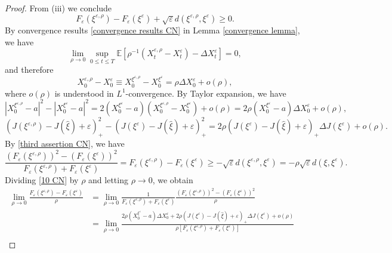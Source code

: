 \documentclass[11pt,a4paper]{article}
\begin{document}
\begin{proof}
From (iii) we conclude
\begin{equation}
\label{third assertion CN}
F_\varepsilon(\xi^{\varepsilon, \rho})-F_\varepsilon(\xi^\varepsilon)+\sqrt{\varepsilon}d(\xi^{\varepsilon, \rho},\xi^\varepsilon) \geq 0.
\end{equation}
By  convergence results \eqref{convergence results CN} in Lemma \ref{convergence lemma},  we have
$$\lim_{\rho \to 0}\sup_{0 \leq t \leq T}\mathbb E\left[\rho^{-1}(X^{\varepsilon, \rho}_t-{X}^\varepsilon_t)-\Delta{X}^\varepsilon_t\right]=0,$$
and therefore
$$X^{\varepsilon, \rho}_0-{X}^\varepsilon_0\equiv X_0^{\xi^{\varepsilon, \rho}}-X_0^{\xi^\varepsilon}=\rho\Delta{X}^\varepsilon_0+o(\rho),$$
where $o(\rho)$ is understood in $L^1$-convergence.
By Taylor expansion, we have
\begin{equation}
\label{Taylor1}
    |X_0^{\xi^{\varepsilon, \rho}}-a|^2-|X_0^{\xi^\varepsilon}-a|^2=2( X_0^{\xi^\varepsilon}-a)(X_0^{\xi^{\varepsilon, \rho}}-X_0^{\xi^\varepsilon})+o(\rho)=2 \rho( X_0^{\xi^\varepsilon}-a) \Delta{X}^\varepsilon_0+o(\rho),
\end{equation}
\begin{equation}
\label{Taylor2}
   (J(\xi^{\varepsilon, \rho})-J(\hat \xi)+\varepsilon)_+^2-(J(\xi^\varepsilon)-J(\hat \xi)+\varepsilon)_+^2=2\rho (J(\xi^\varepsilon)-J(\hat \xi)+\varepsilon)_+\Delta{J}(\xi^\varepsilon)+o(\rho). 
\end{equation}
By \eqref{third assertion CN}, we have 
\begin{equation}
\label{10 CN}
    \frac{(F_\varepsilon(\xi^{\varepsilon, \rho}))^2-(F_\varepsilon(\xi^\varepsilon))^2}{F_\varepsilon(\xi^{\varepsilon, \rho})+F_\varepsilon(\xi^\varepsilon)}=F_\varepsilon(\xi^{\varepsilon, \rho})-F_\varepsilon(\xi^\varepsilon)\geq -\sqrt{\varepsilon}d(\xi^{\varepsilon, \rho},\xi^\varepsilon)=-\rho\sqrt{\varepsilon}d(\xi,\xi^\varepsilon).
\end{equation}
Dividing \eqref{10 CN} by $\rho$ and letting $\rho \to 0$, we obtain
\begin{align*}
    \lim_{\rho \to 0}\frac{F_\varepsilon(\xi^{\varepsilon, \rho})-F_\varepsilon(\xi^\varepsilon)}{\rho}
    &=\lim_{\rho \to 0}\frac{1}{F_\varepsilon(\xi^{\varepsilon, \rho})+F_\varepsilon(\xi^\varepsilon)}\frac{(F_\varepsilon(\xi^{\varepsilon, \rho}))^2-(F_\varepsilon(\xi^\varepsilon))^2}{\rho}&\\
    &=\lim_{\rho \to 0}\frac{2 \rho( X_0^{\xi^\varepsilon}-a) \Delta{X}^\varepsilon_0+2\rho (J(\xi^\varepsilon)-J(\hat \xi)+\varepsilon)_+\Delta{J}(\xi^\varepsilon)+o(\rho)}{\rho [F_\varepsilon(\xi^{\varepsilon, \rho})+F_\varepsilon(\xi^\varepsilon)]}\\

\end{align*}
\end{proof}
\end{document}

